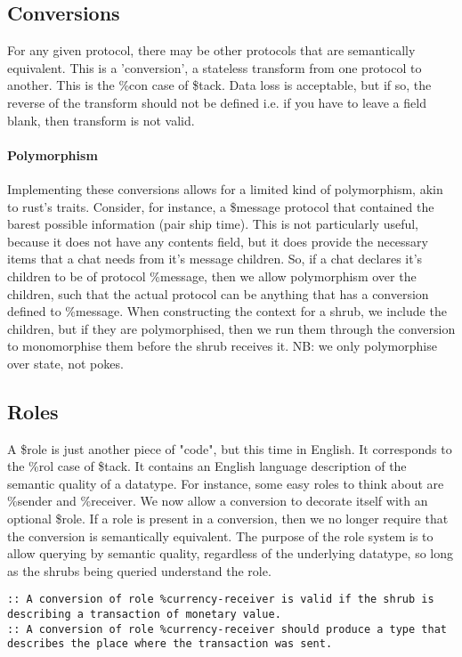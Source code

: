 \documentclass[twoside]{report}
\begin{document}
\subsection{Conversions}

For any given protocol, there may be other protocols that are semantically equivalent. This is a 'conversion', a stateless transform from one protocol to another. This is the \%con case of \$tack. Data loss is acceptable, but if so, the reverse of the transform should not be defined i.e. if you have to leave a field blank, then transform is not valid.

\paragraph{Polymorphism}

Implementing these conversions allows for a limited kind of polymorphism, akin to rust's traits. Consider, for instance, a \$message protocol that contained the barest possible information (pair ship time). This is not particularly useful, because it does not have any contents field, but it does provide the necessary items that a chat needs from it's message children. So, if a chat declares it's children to be of protocol \%message, then we allow polymorphism over the children, such that the actual protocol can be anything that has a conversion defined to \%message. When constructing the context for a shrub, we include the children, but if they are polymorphised, then we run them through the conversion to monomorphise them before the shrub receives it. NB: we only polymorphise over state, not pokes.

\subsection{Roles}

A \$role is just another piece of "code", but this time in English. It corresponds to the \%rol case of \$tack. It contains an English language description of the semantic quality of a datatype. For instance, some easy roles to think about are \%sender and \%receiver. We now allow a conversion to decorate itself with an optional \$role. If a role is present in a conversion, then we no longer require that the conversion is semantically equivalent. The purpose of the role system is to allow querying by semantic quality, regardless of the underlying datatype, so long as the shrubs being queried understand the role.

\begin{lstlisting}
:: A conversion of role %currency-receiver is valid if the shrub is describing a transaction of monetary value.
:: A conversion of role %currency-receiver should produce a type that describes the place where the transaction was sent.
\end{lstlisting}
\end{document}
